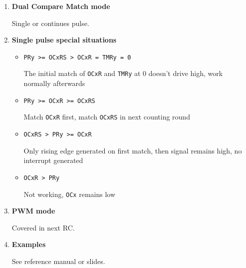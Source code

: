 \documentclass[a4paper]{article}
\begin{document}
\begin{enumerate}[label = \arabic*.]
		\item \textbf{Dual Compare Match mode}
			\par Single or continues pulse.

		\item \textbf{Single pulse special situations}
			\begin{itemize}[leftmargin = 1cm]
				\item \verb|PRy >= OCxRS > OCxR = TMRy = 0|
					\par The initial match of \verb|OCxR| and \verb|TMRy| at 0 doesn't drive high, work normally afterwards
				\item \verb|PRy >= OCxR >= OCxRS|
					\par Match \verb|OCxR| first, match \verb|OCxRS| in next counting round
				\item \verb|OCxRS > PRy >= OCxR|
					\par Only rising edge generated on first match, then signal remains high, no interrupt generated
				\item \verb|OCxR > PRy|
					\par Not working, \verb|OCx| remains low
			\end{itemize}

		\item \textbf{PWM mode}
			\par Covered in next RC\@.

		\item \textbf{Examples}
			\par See reference manual or slides.
	\end{enumerate}
\end{document}

